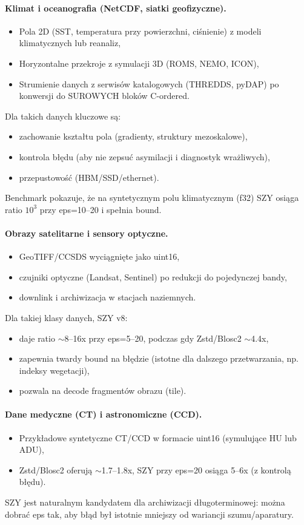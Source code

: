 \documentclass[11pt,a4paper]{article}
\begin{document}
\paragraph{Klimat i oceanografia (NetCDF, siatki geofizyczne).}
\begin{itemize}
  \item Pola 2D (SST, temperatura przy powierzchni, ciśnienie) z modeli klimatycznych lub reanaliz,
  \item Horyzontalne przekroje z symulacji 3D (ROMS, NEMO, ICON),
  \item Strumienie danych z serwisów katalogowych (THREDDS, pyDAP) po konwersji do SUROWYCH bloków C-ordered.
\end{itemize}
Dla takich danych kluczowe są:
\begin{itemize}
  \item zachowanie kształtu pola (gradienty, struktury mezoskalowe),
  \item kontrola błędu (aby nie zepsuć asymilacji i diagnostyk wrażliwych),
  \item przepustowość (HBM/SSD/ethernet).
\end{itemize}
Benchmark pokazuje, że na syntetycznym polu klimatycznym (f32) SZY osiąga ratio $10^3$ przy eps=10--20 i spełnia bound.

\paragraph{Obrazy satelitarne i sensory optyczne.}
\begin{itemize}
  \item GeoTIFF/CCSDS wyciągnięte jako uint16,
  \item czujniki optyczne (Landsat, Sentinel) po redukcji do pojedynczej bandy,
  \item downlink i archiwizacja w stacjach naziemnych.
\end{itemize}
Dla takiej klasy danych, SZY v8:
\begin{itemize}
  \item daje ratio $\sim$8--16x przy eps=5--20, podczas gdy Zstd/Blosc2 $\sim$4.4x,
  \item zapewnia twardy bound na błędzie (istotne dla dalszego przetwarzania, np. indeksy wegetacji),
  \item pozwala na decode fragmentów obrazu (tile).
\end{itemize}

\paragraph{Dane medyczne (CT) i astronomiczne (CCD).}
\begin{itemize}
  \item Przykładowe syntetyczne CT/CCD w formacie uint16 (symulujące HU lub ADU),
  \item Zstd/Blosc2 oferują $\sim$1.7--1.8x, SZY przy eps=20 osiąga 5--6x (z kontrolą błędu).
\end{itemize}
SZY jest naturalnym kandydatem dla archiwizacji długoterminowej: można dobrać eps tak, aby błąd był istotnie mniejszy od wariancji szumu/aparatury.
\end{document}
